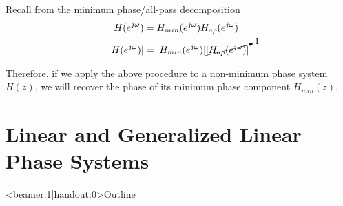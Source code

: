 \documentclass[10pt, aspectratio=169]{beamer}
\begin{document}
\begin{frame}
Recall from the minimum phase/all-pass decomposition
\begin{align*}
H(e^{j\omega}) &= H_{min}(e^{j\omega})H_{ap}(e^{j\omega}) \\
|H(e^{j\omega})| &= |H_{min}(e^{j\omega})|\cancelto{1}{|H_{ap}(e^{j\omega})|} \\
\end{align*}

Therefore, if we apply the above procedure to a non-minimum phase system $H(z)$, we will recover the phase of its minimum phase component $H_{min}(z)$.
\end{frame}

%
%
%
%
%
%
%

\section{Linear and Generalized Linear Phase Systems}
\begin{frame}<beamer:1|handout:0>{Outline}
\tableofcontents[currentsection]
\end{frame}
\end{document}
